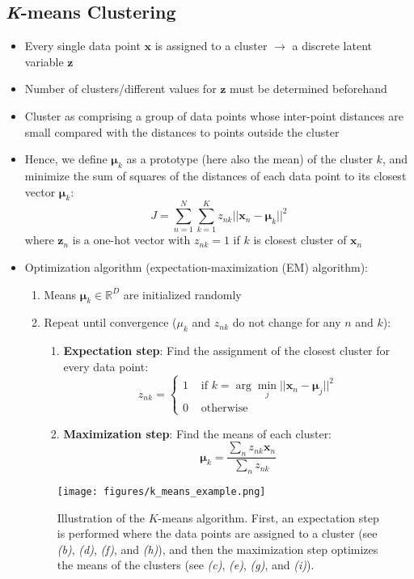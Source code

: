 \subsection{\textit{K}-means Clustering}
\begin{itemize}
	\item Every single data point $\bm{x}$ is assigned to a cluster $\to$ a discrete latent variable $\bm{z}$
	\item Number of clusters/different values for $\bm{z}$ must be determined beforehand
	\item Cluster as comprising a group of data points whose inter-point distances are small compared with the distances to points outside the cluster
	\item Hence, we define $\bm{\mu}_k$ as a prototype (here also the mean) of the cluster $k$, and minimize the sum of squares of the distances of each data point to its closest vector $\bm{\mu}_k$:
	$$J=\sum\limits_{n=1}^{N}\sum\limits_{k=1}^{K} z_{nk} ||\bm{x}_n - \bm{\mu}_k||^2$$
	where $\bm{z}_n$ is a one-hot vector with $z_{nk}=1$ if $k$ is closest cluster of $\bm{x}_n$
	\item Optimization algorithm (expectation-maximization (EM) algorithm):
	\begin{enumerate}
		\item Means $\bm{\mu}_k \in \mathbb{R}^D$ are initialized randomly
		\item Repeat until convergence ($\mu_k$ and $z_{nk}$ do not change for any $n$ and $k$):
		\begin{enumerate}
			\item \textbf{Expectation step}: Find the assignment of the closest cluster for every data point:
			$$z_{nk} = \begin{cases}
			1 & \text{ if } k=\arg\min\limits_j ||\bm{x}_n - \bm{\mu}_j||^2\\
			0 & \text{ otherwise }
			\end{cases}$$
			\item \textbf{Maximization step}: Find the means of each cluster:
			$$ \bm{\mu}_k = \frac{\sum_n z_{nk}\bm{x}_n}{\sum_n z_{nk}}$$
		\end{enumerate}
	\end{enumerate}
	\begin{figure}[ht]
		\centering
		\texttt{[image: figures/k\_means\_example.png]}
		\caption{Illustration of the $K$-means algorithm. First, an expectation step is performed where the data points are assigned to a cluster (see \textit{(b)}, \textit{(d)}, \textit{(f)}, and \textit{(h)}), and then the maximization step optimizes the means of the clusters (see \textit{(c)}, \textit{(e)}, \textit{(g)}, and \textit{(i)}).}

\end{figure}
\end{itemize}
